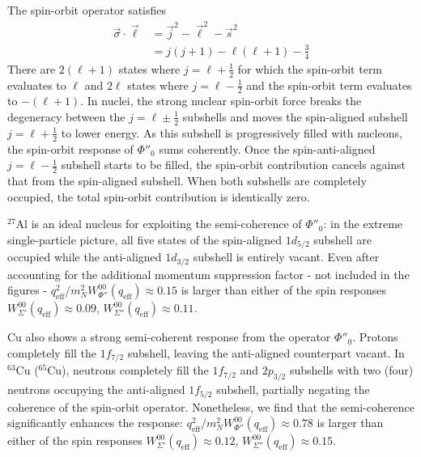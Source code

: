 \documentclass{book}[12pt]
\begin{document}
The spin-orbit operator satisfies
\begin{equation}
\begin{split}
\vec{\sigma}\cdot\vec{\ell}&=\vec{j}^2-\vec{\ell}^2-\vec{s}^2\\
&=j(j+1)-\ell(\ell+1)-\frac{3}{4}
\end{split}
\end{equation}
There are $2(\ell+1)$ states where $j=\ell+\frac{1}{2}$ for which the spin-orbit term evaluates to $\ell$ and $2\ell$ states where $j=\ell-\frac{1}{2}$ and the spin-orbit term evaluates to $-(\ell+1)$. In nuclei, the strong nuclear spin-orbit force breaks the degeneracy between the $j=\ell\pm\frac{1}{2}$ subshells and moves the spin-aligned subshell $j=\ell+\frac{1}{2}$ to lower energy. As this subshell is progressively filled with nucleons, the spin-orbit response of $\Phi''_{0}$ sums coherently. Once the spin-anti-aligned $j=\ell-\frac{1}{2}$ subshell starts to be filled, the spin-orbit contribution cancels against that from the spin-aligned subshell. When both subshells are completely occupied, the total spin-orbit contribution is identically zero.

$^{27}$Al is an ideal nucleus for exploiting the semi-coherence of $\Phi''_{0}$: in the extreme single-particle picture, all five states of the spin-aligned $1d_{5/2}$ subshell are occupied while the anti-aligned $1d_{3/2}$ subshell is entirely vacant. Even after accounting for the additional momentum suppression factor  - not included in the figures - $q_\mathrm{eff}^2/m_N^2W_{\Phi''}^{00}(q_\mathrm{eff})\approx 0.15$ is larger than either of the spin responses $W_{\Sigma'}^{00}(q_\mathrm{eff})\approx 0.09$, $W_{\Sigma''}^{00}(q_\mathrm{eff})\approx 0.11$. 

Cu also shows a strong semi-coherent response from the operator $\Phi''_0$. Protons completely fill the $1f_{7/2}$ subshell, leaving the anti-aligned counterpart vacant. In $^{63}$Cu ($^{65}$Cu), neutrons completely fill the $1f_{7/2}$ and $2p_{3/2}$ subshells with two (four) neutrons occupying the anti-aligned $1f_{5/2}$ subshell, partially negating the coherence of the spin-orbit operator.  Nonetheless, we find that the semi-coherence significantly enhances the response: $q_\mathrm{eff}^2/m_N^2W_{\Phi''}^{00}(q_\mathrm{eff})\approx 0.78$ is larger than either of the spin responses $W_{\Sigma'}^{00}(q_\mathrm{eff})\approx 0.12$, $W_{\Sigma''}^{00}(q_\mathrm{eff})\approx 0.15$. 
\end{document}
